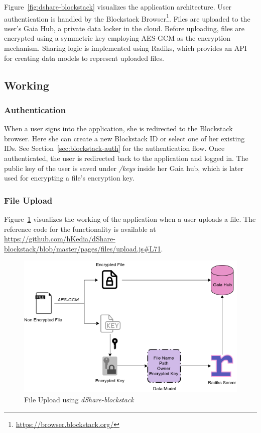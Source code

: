 Figure~\ref{fig:dshare-blockstack} visualizes the application architecture. User authentication is handled by the Blockstack Browser\footnote{\url{https://browser.blockstack.org/}}. Files are uploaded to the user's Gaia Hub, a private data locker in the cloud. Before uploading, files are encrypted using a symmetric key employing AES-GCM as the encryption mechanism. Sharing logic is implemented using Radiks, which provides an API for creating data models to represent uploaded files.

\subsection{Working}

\subsubsection{Authentication}
When a user signs into the application, she is redirected to the Blockstack browser. Here she can create a new Blockstack ID or select one of her existing IDs. See Section~\ref{sec:blockstack-auth} for the authentication flow. Once authenticated, the user is redirected back to the application and logged in. The public key of the user is saved under \textit{/keys} inside her Gaia hub, which is later used for encrypting a file's encryption key.

\subsubsection{File Upload}
Figure~\ref{fig:blockstack-upload} visualizes the working of the application when a user uploads a file. The reference code for the functionality is available at \url{https://github.com/hKedia/dShare-blockstack/blob/master/pages/files/upload.js#L71}.

\begin{figure}[h]
	\includegraphics[width=\linewidth]{figures/blockstack-upload}
	\caption{\label{fig:blockstack-upload} File Upload using \textit{dShare-blockstack}}
\end{figure}

